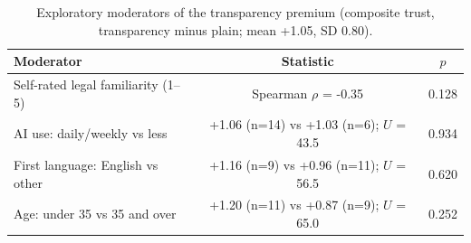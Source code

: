 \begin{table}[H]
\centering
\caption{Exploratory moderators of the transparency premium (composite trust, transparency minus plain; mean +1.05, SD 0.80).}
\label{tab:us-moderators}
{\footnotesize{}\setlength{\tabcolsep}{4pt}
\begin{tabular}{lcc}
\toprule
\textbf{Moderator} & \textbf{Statistic} & \textbf{$p$} \\
\midrule
Self-rated legal familiarity (1--5) & Spearman $\rho$ = -0.35 & 0.128 \\
AI use: daily/weekly vs less & +1.06 (n=14) vs +1.03 (n=6); $U$ = 43.5 & 0.934 \\
First language: English vs other & +1.16 (n=9) vs +0.96 (n=11); $U$ = 56.5 & 0.620 \\
Age: under 35 vs 35 and over & +1.20 (n=11) vs +0.87 (n=9); $U$ = 65.0 & 0.252 \\
\bottomrule
\end{tabular}
}
\end{table}
